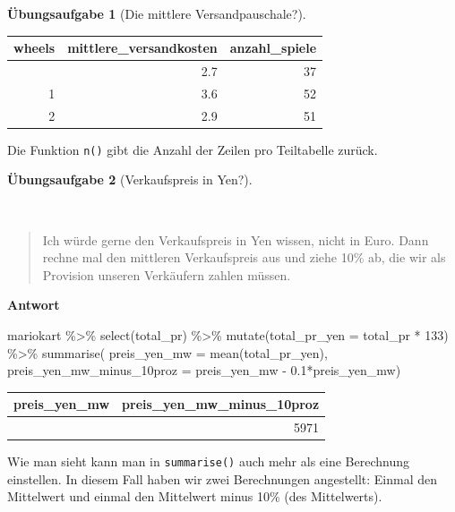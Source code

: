 \documentclass[
  letterpaper,
]{scrbook}
\newenvironment{Shaded}{\begin{snugshade}}{\end{snugshade}}
\newcommand{\AttributeTok}[1]{\textcolor[rgb]{0.40,0.45,0.13}{#1}}
\newcommand{\DecValTok}[1]{\textcolor[rgb]{0.68,0.00,0.00}{#1}}
\newcommand{\FloatTok}[1]{\textcolor[rgb]{0.68,0.00,0.00}{#1}}
\newcommand{\FunctionTok}[1]{\textcolor[rgb]{0.28,0.35,0.67}{#1}}
\newcommand{\NormalTok}[1]{\textcolor[rgb]{0.00,0.23,0.31}{#1}}
\newcommand{\SpecialCharTok}[1]{\textcolor[rgb]{0.37,0.37,0.37}{#1}}
\theoremstyle{definition}
\newtheorem{exercise}{Übungsaufgabe}[chapter]
\theoremstyle{definition}
\theoremstyle{definition}
\theoremstyle{remark}
\begin{document}
\begin{exercise}[Die mittlere
Versandpauschale?]
\begin{longtable}[]{@{}rrr@{}}
\toprule\noalign{}
wheels & mittlere\_versandkosten & anzahl\_spiele \\
\midrule\noalign{}
\endhead
\bottomrule\noalign{}
\endlastfoot
0 & 2.7 & 37 \\
1 & 3.6 & 52 \\
2 & 2.9 & 51 \\
\end{longtable}

Die Funktion \texttt{n()} gibt die Anzahl der Zeilen pro Teiltabelle
zurück.

\end{exercise}

\begin{exercise}[Verkaufspreis in
Yen?]\protect\hypertarget{exr-Forschungsfrage3}{}\label{exr-Forschungsfrage3}

~

\begin{quote}
{} Ich würde gerne den Verkaufspreis in Yen wissen, nicht
in Euro. Dann rechne mal den mittleren Verkaufspreis aus und ziehe 10\%
ab, die wir als Provision unseren Verkäufern zahlen müssen.
\end{quote}

\textbf{Antwort}

\begin{Shaded}
\begin{Highlighting}[]
\NormalTok{mariokart }\SpecialCharTok{\%\textgreater{}\%} 
  \FunctionTok{select}\NormalTok{(total\_pr) }\SpecialCharTok{\%\textgreater{}\%} 
  \FunctionTok{mutate}\NormalTok{(}\AttributeTok{total\_pr\_yen =}\NormalTok{ total\_pr }\SpecialCharTok{*} \DecValTok{133}\NormalTok{) }\SpecialCharTok{\%\textgreater{}\%} 
  \FunctionTok{summarise}\NormalTok{(}
    \AttributeTok{preis\_yen\_mw =} \FunctionTok{mean}\NormalTok{(total\_pr\_yen),}
    \AttributeTok{preis\_yen\_mw\_minus\_10proz =}\NormalTok{ preis\_yen\_mw }\SpecialCharTok{{-}} \FloatTok{0.1}\SpecialCharTok{*}\NormalTok{preis\_yen\_mw)}
\end{Highlighting}
\end{Shaded}

\begin{longtable}[]{@{}rr@{}}
\toprule\noalign{}
preis\_yen\_mw & preis\_yen\_mw\_minus\_10proz \\
\midrule\noalign{}
\endhead
\bottomrule\noalign{}
\endlastfoot
6634 & 5971 \\
\end{longtable}

Wie man sieht kann man in \texttt{summarise()} auch mehr als eine
Berechnung einstellen. In diesem Fall haben wir zwei Berechnungen
angestellt: Einmal den Mittelwert und einmal den Mittelwert minus 10\%
(des Mittelwerts).

\end{exercise}
\end{document}
